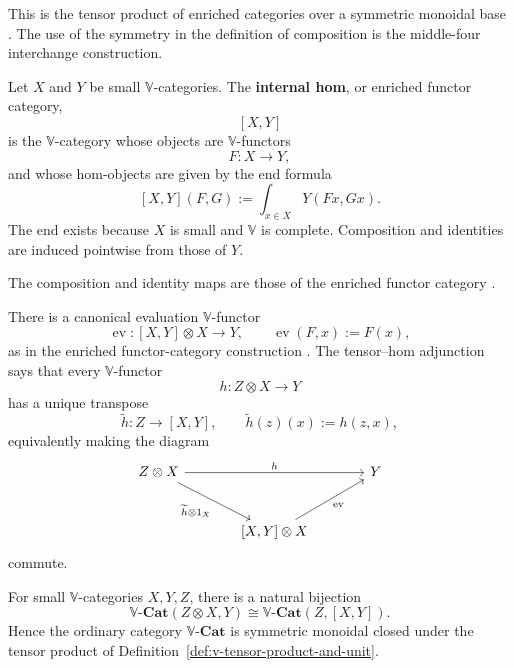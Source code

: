 This is the tensor product of enriched categories over a symmetric monoidal base \cite[Section~1.4, formulas~(1.17)--(1.18)]{Kelly1982BasicConcepts}. The use of the symmetry in the definition of composition is the middle-four interchange construction.

\begin{definition}
\label{def:v-internal-hom}
    Let \(X\) and \(Y\) be small \(\mathbb V\)-categories. The \textbf{internal hom}, or enriched functor category,
    \[
        [X,Y]
    \]
    is the \(\mathbb V\)-category whose objects are \(\mathbb V\)-functors
    \[
        F:X\to Y,
    \]
    and whose hom-objects are given by the end formula \cite[Section~2.2, formula~(2.10)]{Kelly1982BasicConcepts}
    \[
        [X,Y](F,G)
        :=
        \int_{x\in X}Y(Fx,Gx).
    \]
    The end exists because \(X\) is small and \(\mathbb V\) is complete. Composition and identities are induced pointwise from those of \(Y\).
\end{definition}

The composition and identity maps are those of the enriched functor
category
\cite[Section~2.2, formulas~(2.14)--(2.15)]{Kelly1982BasicConcepts}.

There is a canonical evaluation \(\mathbb V\)-functor
\[
    \operatorname{ev}:[X,Y]\otimes X\longrightarrow Y,
    \qquad
    \operatorname{ev}(F,x):=F(x),
\]
as in the enriched functor-category construction
\cite[Section~2.2, formula~(2.17)]{Kelly1982BasicConcepts}.
The tensor--hom adjunction says that every \(\mathbb V\)-functor
\[
    h:Z\otimes X\to Y
\]
has a unique transpose
\[
    \widetilde h:Z\to [X,Y],
    \qquad
    \widetilde h(z)(x):=h(z,x),
\]
equivalently making the diagram
\[
\begin{tikzcd}[column sep=large,row sep=large]
Z\otimes X
    \arrow[rr,"h"]
    \arrow[dr,"\widetilde h\otimes 1_X"']
&&
Y
\\
&
\left[X,Y\right]\otimes X
    \arrow[ur,"\operatorname{ev}"']
\end{tikzcd}
\]
commute.

\begin{proposition}
\label{prop:v-tensor-hom-adjunction}
    For small \(\mathbb V\)-categories \(X,Y,Z\), there is a natural bijection
    \[
        \mathbb V\text{-}\mathbf{Cat}(Z\otimes X,Y)
        \cong
        \mathbb V\text{-}\mathbf{Cat}(Z,[X,Y]).
    \]
    Hence the ordinary category \(\mathbb V\text{-}\mathbf{Cat}\) is symmetric monoidal closed under the tensor product of Definition~\ref{def:v-tensor-product-and-unit}.
\end{proposition}

